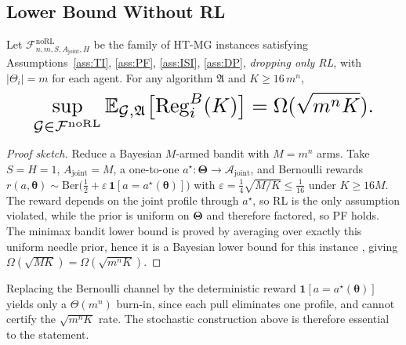 \subsection{Lower Bound Without RL}
\label{app:lower-no-pf}
\label{sec:lower-no-pf-app}

\begin{theorem}
\label{thm:lower-no-pf}
Let $\mathcal F^{\mathrm{noRL}}_{n,m,S,A_{\mathrm{joint}},H}$ be the family of HT-MG instances satisfying Assumptions~\ref{ass:TI}, \ref{ass:PF}, \ref{ass:ISI}, \ref{ass:DP}, \emph{dropping only RL}, with $|\Theta_i|=m$ for each agent. For any algorithm $\mathfrak A$ and $K\ge 16\,m^n$,
\begin{equation}\resizebox{0.9\linewidth}{!}{$\displaystyle \sup_{\mathcal G\in\mathcal F^{\mathrm{noRL}}} \mathbb{E}_{\mathcal G,\mathfrak A}\big[\mathrm{Reg}_i^B(K)\big] = \Omega(\sqrt{m^n K}). $}\end{equation}
\end{theorem}

\begin{proof}[Proof sketch]
Reduce a Bayesian $M$-armed bandit with $M=m^n$ arms. Take $S=H=1$, $A_{\mathrm{joint}}=M$, a one-to-one $a^\star\colon\boldsymbol\Theta\to\mathcal A_{\mathrm{joint}}$, and Bernoulli rewards $r(a,\boldsymbol\theta)\sim\mathrm{Ber}\big(\tfrac12+\varepsilon\,\mathbf 1[a=a^\star(\boldsymbol\theta)]\big)$ with $\varepsilon=\tfrac14\sqrt{M/K}\le\tfrac1{16}$ under $K\ge16M$. The reward depends on the joint profile through $a^\star$, so RL is the only assumption violated, while the prior is uniform on $\boldsymbol\Theta$ and therefore factored, so PF holds. The minimax bandit lower bound is proved by averaging over exactly this uniform needle prior, hence it is a Bayesian lower bound for this instance \citep[\S 15]{lattimore2020bandit}, giving $\Omega(\sqrt{MK})=\Omega(\sqrt{m^nK})$.
\end{proof}

\begin{remark}
\label{rem:lower-deterministic}
Replacing the Bernoulli channel by the deterministic reward $\mathbf 1[a=a^\star(\boldsymbol\theta)]$ yields only a $\Theta(m^n)$ burn-in, since each pull eliminates one profile, and cannot certify the $\sqrt{m^nK}$ rate. The stochastic construction above is therefore essential to the statement.
\end{remark}

